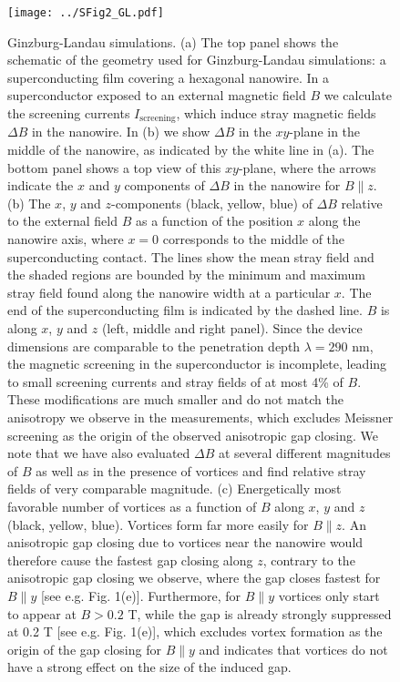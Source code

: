 \documentclass[prl,singlecolumn,notitlepage,secnumroman,superscriptaddress,nobibnotes,graphicx,amsmath,amssymb]{revtex4-2}
\begin{document}
\begin{figure}
\centering
\texttt{[image: ../SFig2\_GL.pdf]}
\caption{
	\label{fig:GL}Ginzburg-Landau simulations.
	(a) The top panel shows the schematic of the geometry used for Ginzburg-Landau simulations: a superconducting film covering a hexagonal nanowire. In a superconductor exposed to an external magnetic field $B$ we calculate the screening currents $I_{\mathrm{screening}}$, which induce stray magnetic fields $\Delta B$ in the nanowire. In (b) we show $\Delta B$ in the $xy$-plane in the middle of the nanowire, as indicated by the white line in (a). The bottom panel shows a top view of this $xy$-plane, where the arrows indicate the $x$ and $y$ components of $\Delta B$ in the nanowire for $B \parallel z$. (b) The $x$, $y$ and $z$-components (black, yellow, blue) of $\Delta B$ relative to the external field $B$ as a function of the position $x$ along the nanowire axis, where $x = 0$ corresponds to the middle of the superconducting contact. The lines show the mean stray field and the shaded regions are bounded by the minimum and maximum stray field found along the nanowire width at a particular $x$.  The end of the superconducting film is indicated by the dashed line. $B$ is along $x$, $y$ and $z$ (left, middle and right panel). Since the device dimensions are comparable to the penetration depth $\lambda = 290$ nm, the magnetic screening in the superconductor is incomplete, leading to small screening currents and stray fields of at most 4\% of $B$. These modifications are much smaller and do not match the anisotropy we observe in the measurements, which excludes Meissner screening as the origin of the observed anisotropic gap closing. We note that we have also evaluated $\Delta B$ at several different magnitudes of $B$ as well as in the presence of vortices and find relative stray fields of very comparable magnitude. (c) Energetically most favorable number of vortices as a function of $B$ along $x$, $y$ and $z$ (black, yellow, blue). Vortices form far more easily for $B \parallel z$. An anisotropic gap closing due to vortices near the nanowire would therefore cause the fastest gap closing along $z$, contrary to the anisotropic gap closing we observe, where the gap closes fastest for $B \parallel  y$ [see e.g. Fig. 1(e)]. Furthermore, for $B \parallel y$ vortices only start to appear at $B > 0.2$ T, while the gap is already strongly suppressed at 0.2 T [see e.g. Fig. 1(e)], which excludes vortex formation as the origin of the gap closing for $B \parallel y$ and indicates that vortices do not have a strong effect on the size of the induced gap.}
\end{figure}
\end{document}
